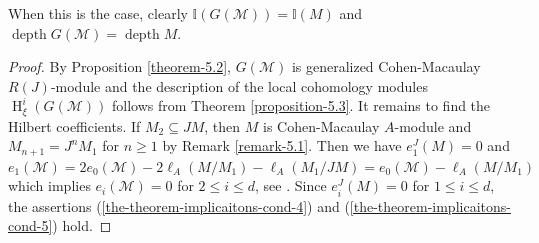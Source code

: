 \documentclass[11pt,reqno]{amsart}
\theoremstyle{definition}
\def\M{{\mathcal M}}
\DeclareMathOperator{\h}{H}
\DeclareMathOperator{\depth}{depth}
\numberwithin{equation}{section}
\begin{document}
When this is the case, clearly $\mathbb{I}(G(\M))=\mathbb{I}(M)$ and $\depth G(\M)=\depth M$. 
\begin{proof}
	By Proposition \ref{theorem-5.2}, $G(\M)$ is generalized Cohen-Macaulay $R(J)$-module and the description of the local cohomology modules  $\h^i_{\xi}(G(\M))$ follows from Theorem \ref{proposition-5.3}. It remains to find the Hilbert coefficients. 	If $M_2\subseteq JM$, then $M$ is Cohen-Macaulay $A$-module and $M_{n+1}=J^nM_1$ for $n\geq 1$ by Remark \ref{remark-5.1}. Then we have 
	$e_1^J(M)=0$ and $e_1(\M)=2e_0(\M)-2\ell_A(M/M_1)-\ell_A(M_1/JM)=e_0(\M)-\ell_A(M/M_1)$ which implies $e_i(\M)=0$ for $2\leq i\leq d$, see \cite[Theorem 2.9]{rossi-valla}. 
	Since $e_i^J(M)=0$ for $1\leq i\leq d$, the  assertions (\ref{the-theorem-implicaitons-cond-4}) and (\ref{the-theorem-implicaitons-cond-5}) hold. 
	

\end{proof}
\end{document}
